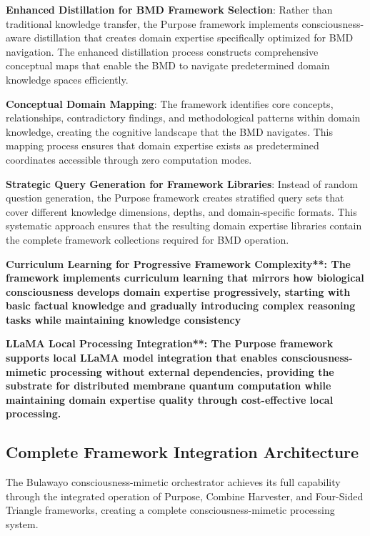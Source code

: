 \documentclass[12pt,a4paper]{article}
\begin{document}
\textbf{Enhanced Distillation for BMD Framework Selection}: Rather than traditional knowledge transfer, the Purpose framework implements consciousness-aware distillation that creates domain expertise specifically optimized for BMD navigation. The enhanced distillation process constructs comprehensive conceptual maps that enable the BMD to navigate predetermined domain knowledge spaces efficiently.

\textbf{Conceptual Domain Mapping}: The framework identifies core concepts, relationships, contradictory findings, and methodological patterns within domain knowledge, creating the cognitive landscape that the BMD navigates. This mapping process ensures that domain expertise exists as predetermined coordinates accessible through zero computation modes.

\textbf{Strategic Query Generation for Framework Libraries}: Instead of random question generation, the Purpose framework creates stratified query sets that cover different knowledge dimensions, depths, and domain-specific formats. This systematic approach ensures that the resulting domain expertise libraries contain the complete framework collections required for BMD operation.

\textbf{Curriculum Learning for Progressive Framework Complexity**: The framework implements curriculum learning that mirrors how biological consciousness develops domain expertise progressively, starting with basic factual knowledge and gradually introducing complex reasoning tasks while maintaining knowledge consistency}

\textbf{LLaMA Local Processing Integration**: The Purpose framework supports local LLaMA model integration that enables consciousness-mimetic processing without external dependencies, providing the substrate for distributed membrane quantum computation while maintaining domain expertise quality through cost-effective local processing.}

\subsection{Complete Framework Integration Architecture}

The Bulawayo consciousness-mimetic orchestrator achieves its full capability through the integrated operation of Purpose, Combine Harvester, and Four-Sided Triangle frameworks, creating a complete consciousness-mimetic processing system.
\end{document}
